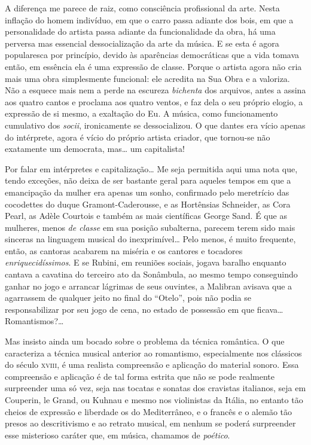 A diferença me parece de raiz, como consciência profissional da arte.
Nesta inflação do homem indivíduo, em que o carro passa adiante dos
bois, em que a personalidade do artista passa adiante da funcionalidade
da obra, há uma perversa mas essencial dessocialização da arte da
música. E se esta é agora popularesca por princípio, devido às
aparências democráticas que a vida tomava então, em essência ela é uma
expressão de classe. Porque o artista agora não cria mais uma obra
simplesmente funcional: ele acredita na Sua Obra e a valoriza. Não a
esquece mais nem a perde na escureza \textit{bichenta} dos arquivos, antes a
assina aos quatro cantos e proclama aos quatro ventos, e faz dela o seu
próprio elogio, a expressão de si mesmo, a exaltação do Eu. A música,
como funcionamento cumulativo dos \textit{socii}, ironicamente se dessocializou.
O que dantes era vício apenas do intérprete, agora é vício do próprio
artista criador, que tornou-se não exatamente um democrata, mas\ldots{} um
capitalista!

Por falar em intérpretes e capitalização\ldots{} Me seja permitida aqui uma
nota que, tendo exceções, não deixa de ser bastante geral para aqueles
tempos em que a emancipação da mulher era apenas um sonho, confirmado
pelo meretrício das cocodettes do duque Gramont-Caderousse, e as
Hortênsias Schneider, as Cora Pearl, as Adèle Courtois e também as mais
científicas George Sand. É que as mulheres, menos \textit{de classe} em sua
posição subalterna, parecem terem sido mais sinceras na linguagem
musical do inexprimível\ldots{} Pelo menos, é muito frequente, então, as
cantoras acabarem na miséria e os cantores e tocadores
\textit{enriquecidíssimos}. E se Rubini, em reuniões sociais, jogava baralho
enquanto cantava a cavatina do terceiro ato da Sonâmbula, ao mesmo tempo
conseguindo ganhar no jogo e arrancar lágrimas de seus ouvintes, a
Malibran avisava que a agarrassem de qualquer jeito no final do ``Otelo'',
pois não podia se responsabilizar por seu jogo de cena, no estado de
possessão em que ficava\ldots{} Romantismos?\ldots{}

Mas insisto ainda um bocado sobre o problema da técnica romântica. O que
caracteriza a técnica musical anterior ao romantismo, especialmente nos
clássicos do século \textsc{xviii}, é uma realista compreensão e aplicação do
material sonoro. Essa compreensão e aplicação é de tal forma estrita que
não se pode realmente surpreender uma só vez, seja nas tocatas e sonatas
dos cravistas italianos, seja em Couperin, le Grand, ou Kuhnau e mesmo nos
violinistas da Itália, no entanto tão cheios de expressão e liberdade os
do Mediterrâneo, e o francês e o alemão tão presos ao descritivismo e ao
retrato musical, em nenhum se poderá surpreender esse misterioso caráter
que, em música, chamamos de \textit{poético}.

